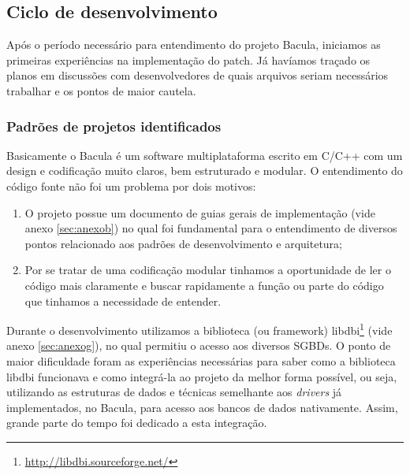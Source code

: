 % 
% 
% 
%  
% 
% 
%  
% 
% 
% 
% 
%  
% 

\subsection{Ciclo de desenvolvimento}

Após o período necessário para entendimento do projeto Bacula, iniciamos as primeiras experiências na implementação do patch. Já havíamos traçado os planos em discussões com desenvolvedores de quais arquivos seriam necessários trabalhar e os pontos de maior cautela.

\subsubsection{Padrões de projetos identificados}

Basicamente o Bacula é um software multiplataforma escrito em C/C++ com um design e codificação muito claros, bem estruturado e modular. O entendimento do código fonte não foi um problema por dois motivos: 
\begin{enumerate}
\item O projeto possue um documento de guias gerais de implementação (vide anexo \ref{sec:anexob}) no qual foi fundamental para o entendimento de diversos pontos relacionado aos padrões de desenvolvimento e arquitetura;
\item Por se tratar de uma codificação modular tinhamos a oportunidade de ler o código mais claramente e buscar rapidamente a função ou parte do código que tinhamos a necessidade de entender.
\end{enumerate}
Durante o desenvolvimento utilizamos a biblioteca (ou framework) libdbi\footnote{\url{http://libdbi.sourceforge.net/}} (vide anexo \ref{sec:anexog}), no qual permitiu o acesso aos diversos SGBDs. O ponto de maior dificuldade foram as experiências necessárias para saber como a biblioteca libdbi funcionava e como integrá-la ao projeto da melhor forma possível, ou seja, utilizando as estruturas de dados e técnicas semelhante aos \textit{drivers} já implementados, no Bacula, para acesso aos bancos de dados nativamente. Assim, grande parte do tempo foi dedicado a esta integração. 

